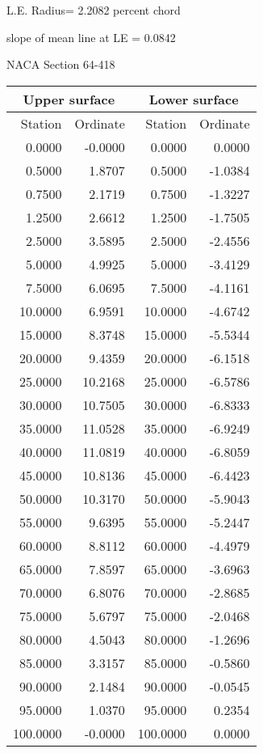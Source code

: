 \documentclass[11pt]{book}
\begin{document}
L.E. Radius=  2.2082 percent chord


 slope of mean line at LE =  0.0842
 \newpage
  \label{s64-418}
 \begin{Large}
 NACA Section 64-418
 \end{Large}
  
 \vspace{8mm}
 \begin{tabular}{|r|r|r|r|} \hline 
 \multicolumn{2}{|c|}{Upper surface} & \multicolumn{2}{|c|}{Lower surface} \\
 \hline
 Station & Ordinate & Station & Ordinate \\
 \hline
0.0000 & -0.0000 & 0.0000 & 0.0000 \\
0.5000 & 1.8707 & 0.5000 & -1.0384 \\
0.7500 & 2.1719 & 0.7500 & -1.3227 \\
1.2500 & 2.6612 & 1.2500 & -1.7505 \\
2.5000 & 3.5895 & 2.5000 & -2.4556 \\
5.0000 & 4.9925 & 5.0000 & -3.4129 \\
7.5000 & 6.0695 & 7.5000 & -4.1161 \\
10.0000 & 6.9591 & 10.0000 & -4.6742 \\
15.0000 & 8.3748 & 15.0000 & -5.5344 \\
20.0000 & 9.4359 & 20.0000 & -6.1518 \\
25.0000 & 10.2168 & 25.0000 & -6.5786 \\
30.0000 & 10.7505 & 30.0000 & -6.8333 \\
35.0000 & 11.0528 & 35.0000 & -6.9249 \\
40.0000 & 11.0819 & 40.0000 & -6.8059 \\
45.0000 & 10.8136 & 45.0000 & -6.4423 \\
50.0000 & 10.3170 & 50.0000 & -5.9043 \\
55.0000 & 9.6395 & 55.0000 & -5.2447 \\
60.0000 & 8.8112 & 60.0000 & -4.4979 \\
65.0000 & 7.8597 & 65.0000 & -3.6963 \\
70.0000 & 6.8076 & 70.0000 & -2.8685 \\
75.0000 & 5.6797 & 75.0000 & -2.0468 \\
80.0000 & 4.5043 & 80.0000 & -1.2696 \\
85.0000 & 3.3157 & 85.0000 & -0.5860 \\
90.0000 & 2.1484 & 90.0000 & -0.0545 \\
95.0000 & 1.0370 & 95.0000 & 0.2354 \\
100.0000 & -0.0000 & 100.0000 & 0.0000 \\
 \hline 
 \end{tabular}
\end{document}
